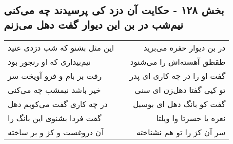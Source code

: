 \begin{center}
\section*{بخش ۱۲۸ - حکایت آن دزد کی پرسیدند چه می‌کنی نیم‌شب در بن این دیوار گفت دهل می‌زنم}
\label{sec:sh128}
\begin{longtable}{l p{0.5cm} r}
این مثل بشنو که شب دزدی عنید
&&
در بن دیوار حفره می‌برید
\\
نیم‌بیداری که او رنجور بود
&&
طقطق آهسته‌اش را می‌شنود
\\
رفت بر بام و فرو آویخت سر
&&
گفت او را در چه کاری ای پدر
\\
خیر باشد نیمشب چه می‌کنی
&&
تو کیی گفتا دهل‌زن ای سنی
\\
در چه کاری گفت می‌کوبم دهل
&&
گفت کو بانگ دهل ای بوسبل
\\
گفت فردا بشنوی این بانگ را
&&
نعره یا حسرتا وا ویلتا
\\
آن دروغست و کژ و بر ساخته
&&
سر آن کژ را تو هم نشناخته
\\
\end{longtable}
\end{center}
